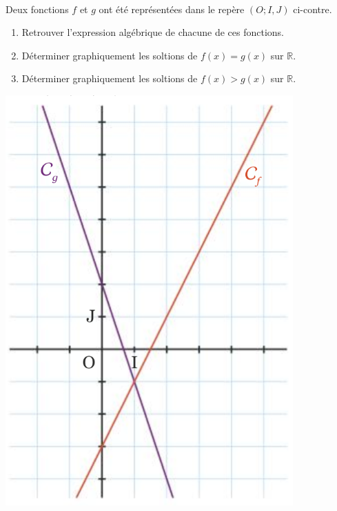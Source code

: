 \documentclass[11pt]{article}
\begin{document}
\begin{exo}~\\
\begin{minipage}[]{.5\textwidth}
  Deux fonctions $f$ et $g$ ont été représentées dans le repère $(O; I, J)$
  ci-contre.
  \begin{enumerate}
    \item Retrouver l'expression algébrique de chacune de ces fonctions.
    \item Déterminer graphiquement les soltions de $f(x)=g(x)$ sur $\mathbb{R}$.
    \item Déterminer graphiquement les soltions de $f(x)>g(x)$ sur $\mathbb{R}$.
  \end{enumerate}
\end{minipage}
\begin{minipage}[]{.5\textwidth}
  \begin{center}
    \includegraphics[scale=.25]{exo3.png}
  \end{center}
\end{minipage}
\end{exo}
\end{document}
